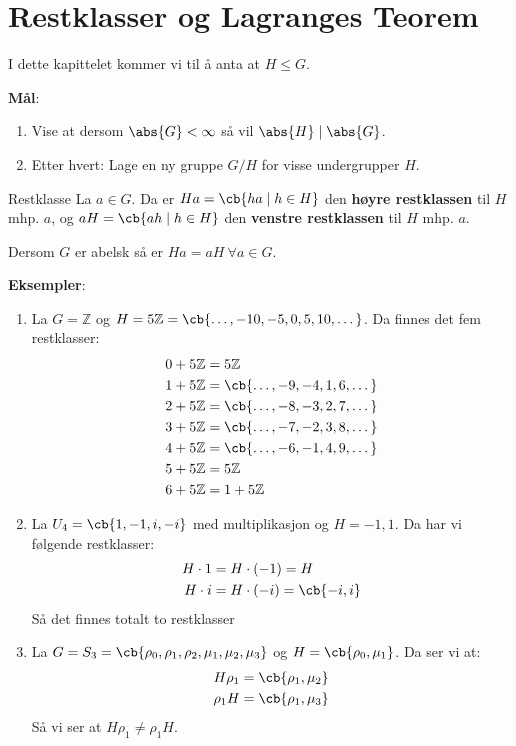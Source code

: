 \section{Restklasser og Lagranges Teorem}
I dette kapittelet kommer vi til å anta at $H\leq G$.

\textbf{Mål}:
\begin{enumerate}
	\item Vise at dersom $\abs{G}<\infty$ så vil $\abs{H}\mid\abs{G}$.
	\item Etter hvert: Lage en ny gruppe $G/H$ for visse undergrupper $H$.
\end{enumerate}

\begin{definition}{Restklasse}{}
	La $a\in G$. Da er $Ha=\cb{ha\mid h\in H}$ den \textbf{høyre restklassen} til $H$ mhp. $a$, og
	$aH=\cb{ah\mid h\in H}$ den \textbf{venstre restklassen} til $H$ mhp. $a$.

	Dersom $G$ er abelsk så er $Ha=aH\ \forall a\in G$.
\end{definition}

\textbf{Eksempler}:

\begin{enumerate}
	\item La $G=\mathbb{Z}$ og $H=5 \mathbb{Z}=\cb{\dots,-10,-5,0,5,10,\dots}$. Da finnes det
	      fem restklasser:
	      \begin{align}
		      0 + 5 \mathbb{Z} & = 5 \mathbb{Z}                    \\
		      1 + 5 \mathbb{Z} & = \cb{\dots, -9, -4, 1, 6, \dots} \\
		      2 + 5 \mathbb{Z} & = \cb{\dots, -8, -3, 2, 7, \dots} \\
		      3 + 5 \mathbb{Z} & = \cb{\dots, -7, -2, 3, 8, \dots} \\
		      4 + 5 \mathbb{Z} & = \cb{\dots, -6, -1, 4, 9, \dots} \\
		      5 + 5 \mathbb{Z} & = 5 \mathbb{Z}                    \\
		      6 + 5 \mathbb{Z} & = 1+5 \mathbb{Z}
	      \end{align}
	\item La $U_4=\cb{1,-1,i,-i}$ med multiplikasjon og $H={-1,1}$. Da har vi følgende
	      restklasser:
	      \begin{align}
		      H\cdot 1 & = H\cdot(-1) = H          \\
		      H\cdot i & = H\cdot(-i) = \cb{-i, i} 
	      \end{align}
        Så det finnes totalt to restklasser
      \item La $G=S_3=\cb{\rho_0, \rho_1, \rho_2, \mu_1, \mu_2, \mu_3}$ og $H=\cb{\rho_0, \mu_1}$.
        Da ser vi at:
        \begin{align}
          H\rho_1 &= \cb{\rho_1, \mu_2} \\
          \rho_1 H &= \cb{\rho_1, \mu_3}
        \end{align}
        Så vi ser at $H\rho_1\neq\rho_1 H$. 
\end{enumerate}

